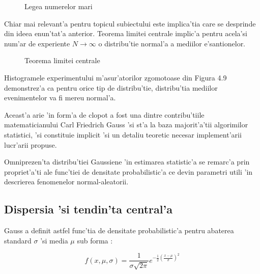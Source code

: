 \documentclass[12pt,a4paper,twoside]{report}
\begin{document}
\begin{figure}[h]
\hspace*{-4cm}
  
  \caption{Legea numerelor mari}
\end{figure}

Chiar mai relevant'a pentru topicul subiectului este implica'tia care se desprinde din ideea enun'tat'a anterior. Teorema limitei centrale \cite{CLT} implic'a pentru acela'si num'ar de experiente $N \to \infty$ o distribu'tie normal'a a mediilor e'santionelor. 


\begin{figure}[h]
\hspace*{-4cm}
  
  \caption{Teorema limitei centrale}
\end{figure}

Histogramele experimentului m'asur'atorilor zgomotoase din Figura 4.9 demonstrez'a ca pentru orice tip de distribu'tie, distribu'tia mediilor evenimentelor va fi mereu normal'a.


\vspace{5px}

Aceast'a arie 'in form'a de clopot a fost una dintre contribu'tiile matematicianului Carl Friedrich Gauss 'si st'a la baza majorit'a'tii algorimilor statistici, 'si constituie implicit 'si un detaliu teoretic necesar implement'arii lucr'arii propuse.

\vspace{5px}

Omniprezen'ta distribu'tiei Gaussiene 'in estimarea statistic'a se remarc'a prin propriet'a'ti ale func'tiei de densitate probabilistic'a ce devin parametri utili 'in descrierea fenomenelor normal-aleatorii. 

\subsection{Dispersia 'si tendin'ta central'a}

Gauss a definit astfel func'tia de densitate probabilistic'a \cite{density} pentru abaterea standard $\sigma$ 'si media $\mu$ sub forma \cite{10.1115/1.3662552}:

\begin{equation}
    f(x, \mu, \sigma) = \frac{1}{\sigma \sqrt{2 \pi}} e^{-\frac{1}{2} (\frac{x - \mu}{\sigma})^2}
\end{equation}

\vspace{5px}
\end{document}

